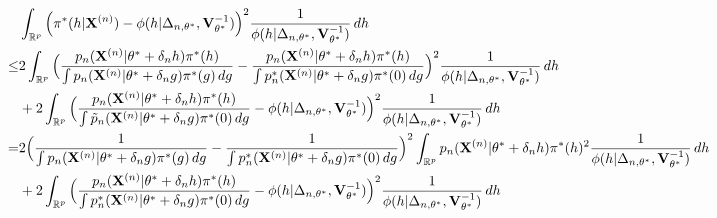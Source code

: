\documentclass[3p]{elsarticle}
\theoremstyle{plain}
\theoremstyle{definition}
\theoremstyle{remark}
\begin{document}
$$
\begin{aligned}
    &\int_{\mathbb{R}^p}\Big(\pi^*(h|\mathbf{X}^{(n)})-\phi(h|\Delta_{n,\theta^*},\mathbf{V}_{\theta^*}^{-1})\Big)^2 \frac{1}{\phi(h|\Delta_{n,\theta^*},\mathbf{V}_{\theta^*}^{-1})} \, dh\\
    \leq&
    2\int_{\mathbb{R}^p}
    \Big(
    \frac{p_n(\mathbf{X}^{(n)}|\theta^*+\delta_n h) \pi^*(h)}{\int p_n (\mathbf{X}^{(n)}|\theta^*+\delta_n g) \pi^*(g) \, dg}
    -
    \frac{p_n(\mathbf{X}^{(n)}|\theta^*+\delta_n h) \pi^*(h)}{\int p_n^* (\mathbf{X}^{(n)}|\theta^*+\delta_n g) \pi^*(0) \, dg}
    \Big)^2 \frac{1}{\phi(h|\Delta_{n,\theta^*},\mathbf{V}_{\theta^*}^{-1})} \, dh\\
    &+
    2\int_{\mathbb{R}^p}
    \Big(
    \frac{p_n(\mathbf{X}^{(n)}|\theta^*+\delta_n h) \pi^*(h)}{\int \tilde{p}_n (\mathbf{X}^{(n)}|\theta^*+\delta_n g) \pi^*(0) \, dg}
    -\phi(h|\Delta_{n,\theta^*},\mathbf{V}_{\theta^*}^{-1})\Big)^2 \frac{1}{\phi(h|\Delta_{n,\theta^*},\mathbf{V}_{\theta^*}^{-1})} \, dh\\
    =&
    2\Big(
    \frac{1}{\int p_n (\mathbf{X}^{(n)}|\theta^*+\delta_n g) \pi^*(g) \, dg}
    -
    \frac{1}{\int p_n^* (\mathbf{X}^{(n)}|\theta^*+\delta_n g) \pi^*(0) \, dg}
    \Big)^2
    \int_{\mathbb{R}^p}
p_n(\mathbf{X}^{(n)}|\theta^*+\delta_n h) \pi^*(h)^2
    \frac{1}{\phi(h|\Delta_{n,\theta^*},\mathbf{V}_{\theta^*}^{-1})} \, dh\\
    &+
    2\int_{\mathbb{R}^p}
    \Big(
    \frac{p_n(\mathbf{X}^{(n)}|\theta^*+\delta_n h) \pi^*(h)}{\int p_n^* (\mathbf{X}^{(n)}|\theta^*+\delta_n g) \pi^*(0) \, dg}
    -\phi(h|\Delta_{n,\theta^*},\mathbf{V}_{\theta^*}^{-1})\Big)^2 \frac{1}{\phi(h|\Delta_{n,\theta^*},\mathbf{V}_{\theta^*}^{-1})} \, dh\\
\end{aligned}
$$
\end{document}
